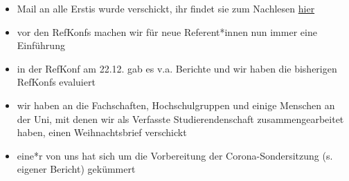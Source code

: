 \begin{itemize}
    \item Mail an alle Erstis wurde verschickt, ihr findet sie zum Nachlesen \href{https://www.stura.uni-heidelberg.de/2020/12/17/rundmail-drei-ratschlaege-fuer-alle-erstis/}{hier}
    \item vor den RefKonfs machen wir für neue Referent*innen nun immer eine Einführung
    \item in der RefKonf am 22.12. gab es v.a. Berichte und wir haben die bisherigen RefKonfs evaluiert
    \item wir haben an die Fachschaften, Hochschulgruppen und einige Menschen an der Uni, mit denen wir als Verfasste Studierendenschaft zusammengearbeitet haben, einen Weihnachtsbrief verschickt
    \item eine*r von uns hat sich um die Vorbereitung der Corona-Sondersitzung (s. eigener Bericht) gekümmert
\end{itemize}


